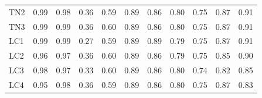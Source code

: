 \documentclass[./dissertation.tex]{subfiles}
\begin{document}
\begin{table}[htbp]
\begin{tabular}{|l|c|c|c|c|c|c|c|c|c|c|}
        TN2                       & 0.99                                 & 0.98                                  & 0.36                                   & 0.59                                    & 0.89                                   & 0.86                                     & 0.80                                    & 0.75                                    & 0.87                                   & 0.91                                  \\
        TN3                       & 0.99                                 & 0.99                                  & 0.36                                   & 0.60                                    & 0.89                                   & 0.86                                     & 0.80                                    & 0.75                                    & 0.87                                   & 0.91                                  \\
        LC1                       & 0.99                                 & 0.99                                  & 0.27                                   & 0.59                                    & 0.89                                   & 0.89                                     & 0.79                                    & 0.75                                    & 0.87                                   & 0.91                                  \\
        LC2                       & 0.96                                 & 0.97                                  & 0.36                                   & 0.60                                    & 0.89                                   & 0.86                                     & 0.79                                    & 0.75                                    & 0.85                                   & 0.90                                  \\
        LC3                       & 0.98                                 & 0.97                                  & 0.33                                   & 0.60                                    & 0.89                                   & 0.86                                     & 0.80                                    & 0.74                                    & 0.82                                   & 0.85                                  \\
        LC4                       & 0.95                                 & 0.98                                  & 0.36                                   & 0.59                                    & 0.89                                   & 0.86                                     & 0.80                                    & 0.75                                    & 0.87                                   & 0.83                                  \\
        \bottomrule
    \end{tabular}
\end{table}
\end{document}
